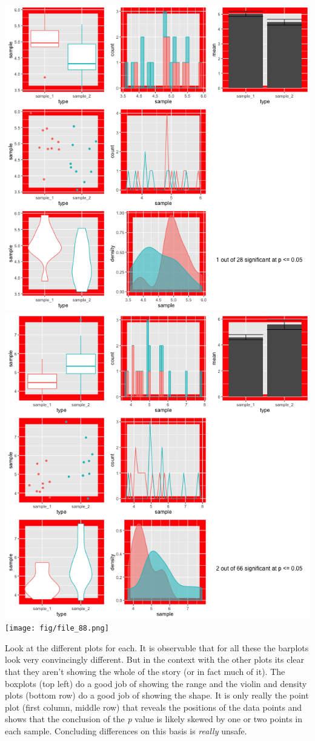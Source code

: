 \documentclass[
]{book}
\begin{document}
\includegraphics{fig/file_28.png}
\includegraphics{fig/file_66.png}
\texttt{[image: fig/file\_88.png]}

Look at the different plots for each. It is observable that for all these the barplots look very convincingly different. But in the context with the other plots its clear that they aren't showing the whole of the story (or in fact much of it). The boxplots (top left) do a good job of showing the range and the violin and density plots (bottom row) do a good job of showing the shape. It is only really the point plot (first column, middle row) that reveals the positions of the data points and shows that the conclusion of the \emph{p} value is likely skewed by one or two points in each sample. Concluding differences on this basis is \emph{really} unsafe.
\end{document}
